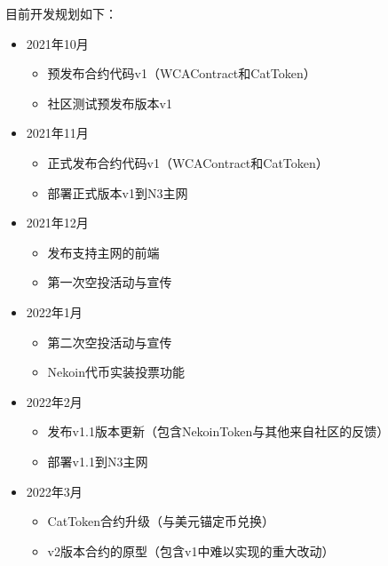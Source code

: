 目前开发规划如下：

\begin{itemize}
    \item 2021年10月
    \begin{itemize}
        \item 预发布合约代码v1（WCAContract和CatToken）
        \item 社区测试预发布版本v1
    \end{itemize}

    \item 2021年11月
    \begin{itemize}
        \item 正式发布合约代码v1（WCAContract和CatToken）
        \item 部署正式版本v1到N3主网
    \end{itemize}

    \item 2021年12月
    \begin{itemize}
        \item 发布支持主网的前端
        \item 第一次空投活动与宣传
    \end{itemize}

    \item 2022年1月
    \begin{itemize}
        \item 第二次空投活动与宣传
        \item Nekoin代币实装投票功能
    \end{itemize}

    \item 2022年2月
    \begin{itemize}
        \item 发布v1.1版本更新（包含NekoinToken与其他来自社区的反馈）
        \item 部署v1.1到N3主网
    \end{itemize}

    \item 2022年3月
    \begin{itemize}
        \item CatToken合约升级（与美元锚定币兑换）
        \item v2版本合约的原型（包含v1中难以实现的重大改动）
    \end{itemize}
\end{itemize}